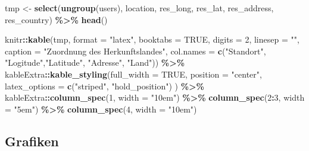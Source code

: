 \documentclass[
  11pt,
]{article}
\newenvironment{Shaded}{\begin{snugshade}}{\end{snugshade}}
\newcommand{\DataTypeTok}[1]{\textcolor[rgb]{0.13,0.29,0.53}{#1}}
\newcommand{\DecValTok}[1]{\textcolor[rgb]{0.00,0.00,0.81}{#1}}
\newcommand{\KeywordTok}[1]{\textcolor[rgb]{0.13,0.29,0.53}{\textbf{#1}}}
\newcommand{\NormalTok}[1]{#1}
\newcommand{\OperatorTok}[1]{\textcolor[rgb]{0.81,0.36,0.00}{\textbf{#1}}}
\newcommand{\OtherTok}[1]{\textcolor[rgb]{0.56,0.35,0.01}{#1}}
\newcommand{\StringTok}[1]{\textcolor[rgb]{0.31,0.60,0.02}{#1}}
\begin{document}
\begin{Shaded}
\begin{Highlighting}[]
\NormalTok{tmp \textless{}{-}}\StringTok{ }\KeywordTok{select}\NormalTok{(}\KeywordTok{ungroup}\NormalTok{(users), location, res\_long, res\_lat, res\_address, res\_country) }\OperatorTok{\%\textgreater{}\%}\StringTok{ }
\StringTok{  }\KeywordTok{head}\NormalTok{()}

\NormalTok{knitr}\OperatorTok{::}\KeywordTok{kable}\NormalTok{(tmp, }\DataTypeTok{format =} \StringTok{"latex"}\NormalTok{, }\DataTypeTok{booktabs =} \OtherTok{TRUE}\NormalTok{, }\DataTypeTok{digits =} \DecValTok{2}\NormalTok{, }\DataTypeTok{linesep =} \StringTok{""}\NormalTok{,}
             \DataTypeTok{caption =} \StringTok{"Zuordnung des Herkunftslandes"}\NormalTok{,}
             \DataTypeTok{col.names =} \KeywordTok{c}\NormalTok{(}\StringTok{"Standort"}\NormalTok{, }\StringTok{"Logitude"}\NormalTok{,}\StringTok{"Latitude"}\NormalTok{, }\StringTok{"Adresse"}\NormalTok{, }\StringTok{"Land"}\NormalTok{)) }\OperatorTok{\%\textgreater{}\%}
\StringTok{  }\NormalTok{kableExtra}\OperatorTok{::}\KeywordTok{kable\_styling}\NormalTok{(}\DataTypeTok{full\_width =} \OtherTok{TRUE}\NormalTok{, }
                            \DataTypeTok{position =} \StringTok{"center"}\NormalTok{,}
                            \DataTypeTok{latex\_options =} \KeywordTok{c}\NormalTok{(}\StringTok{"striped"}\NormalTok{, }\StringTok{"hold\_position"}\NormalTok{)}
\NormalTok{                            ) }\OperatorTok{\%\textgreater{}\%}
\StringTok{  }\NormalTok{kableExtra}\OperatorTok{::}\KeywordTok{column\_spec}\NormalTok{(}\DecValTok{1}\NormalTok{, }\DataTypeTok{width =} \StringTok{"10em"}\NormalTok{) }\OperatorTok{\%\textgreater{}\%}
\StringTok{              }\KeywordTok{column\_spec}\NormalTok{(}\DecValTok{2}\OperatorTok{:}\DecValTok{3}\NormalTok{, }\DataTypeTok{width =} \StringTok{"5em"}\NormalTok{) }\OperatorTok{\%\textgreater{}\%}
\StringTok{              }\KeywordTok{column\_spec}\NormalTok{(}\DecValTok{4}\NormalTok{, }\DataTypeTok{width =} \StringTok{"10em"}\NormalTok{)}
\end{Highlighting}
\end{Shaded}

\linespread{1.5}

\normalsize

\hypertarget{grafiken}{%
\subsection{Grafiken}\label{grafiken}}
\end{document}

